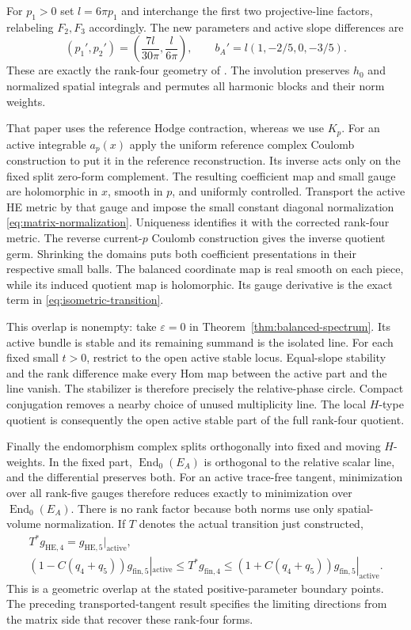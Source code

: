 \documentclass[11pt]{amsart}
\theoremstyle{definition}
\theoremstyle{remark}
\newcommand{\End}{\operatorname{End}}
\begin{document}
For $p_1>0$ set $l=6\pi p_1$ and interchange the first two
projective-line factors, relabeling $F_2,F_3$ accordingly. The new
parameters and active slope differences are
\begin{equation}\label{eq:overlap-parameters}
 (p_1',p_2')=\left(\frac{7l}{30\pi},\frac l{6\pi}\right),
 \qquad b_A'=l(1,-2/5,0,-3/5).
\end{equation}
These are exactly the rank-four geometry of
\cite[Sections 6 and 9]{WuebbenWallMetrics26}. The involution preserves
$h_0$ and normalized spatial integrals and permutes all harmonic blocks
and their norm weights.

That paper uses the reference Hodge contraction, whereas we use $K_p$.
For an active integrable $a_p(x)$ apply the uniform reference complex
Coulomb construction to put it in the reference reconstruction. Its
inverse acts only on the fixed split zero-form complement. The resulting
coefficient map and small gauge are holomorphic in $x$, smooth in $p$,
and uniformly controlled. Transport the active HE metric by that gauge
and impose the small constant diagonal normalization
\eqref{eq:matrix-normalization}. Uniqueness identifies it with the
corrected rank-four metric. The reverse current-$p$ Coulomb construction
gives the inverse quotient germ. Shrinking the domains puts both
coefficient presentations in their respective small balls. The balanced
coordinate map is real smooth on each piece, while its induced quotient
map is holomorphic. Its gauge derivative is the exact term in
\eqref{eq:isometric-transition}.

This overlap is nonempty: take $\varepsilon=0$ in
Theorem~\ref{thm:balanced-spectrum}. Its active bundle is stable and
its remaining summand is the isolated line. For each fixed small $t>0$,
restrict to the open active stable locus. Equal-slope stability and the
rank difference make every Hom map between the active part and the
line vanish. The stabilizer is therefore precisely the relative-phase
circle. Compact conjugation removes a nearby choice of unused
multiplicity line. The local $H$-type quotient is consequently the open
active stable part of the full rank-four quotient.

Finally the endomorphism complex splits orthogonally into fixed and
moving $H$-weights. In the fixed part, $\End_0(E_A)$ is orthogonal
to the relative scalar line, and the differential preserves both.
For an active trace-free tangent, minimization over all rank-five gauges
therefore reduces exactly to minimization over $\End_0(E_A)$.
There is no rank factor because both norms use only spatial-volume
normalization. If $T$ denotes the actual transition just constructed,
\begin{gather}
 T^*g_{\mathrm{HE},4}=g_{\mathrm{HE},5}|_{\mathrm{active}},
 \label{eq:overlap-isometry}\\
 (1-C(q_4+q_5))g_{\mathrm{fin},5}|_{\mathrm{active}}
 \le T^*g_{\mathrm{fin},4}
 \le(1+C(q_4+q_5))g_{\mathrm{fin},5}|_{\mathrm{active}}.
 \label{eq:overlap-finite}
\end{gather}
This is a geometric overlap at the stated positive-parameter boundary
points. The preceding transported-tangent result specifies the limiting
directions from the matrix side that recover these rank-four forms.
\end{document}
